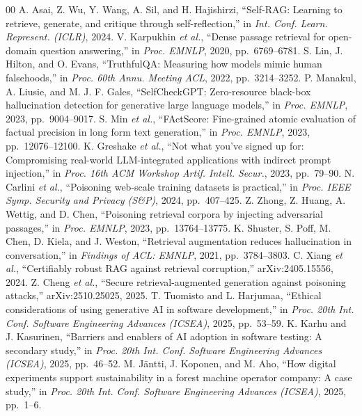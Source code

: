 \begin{thebibliography}{00}
 A. Asai, Z. Wu, Y. Wang, A. Sil, and H. Hajishirzi, ``Self-RAG: Learning to retrieve, generate, and critique through self-reflection,'' in \emph{Int. Conf. Learn. Represent. (ICLR)}, 2024.
 V. Karpukhin \emph{et al.}, ``Dense passage retrieval for open-domain question answering,'' in \emph{Proc. EMNLP}, 2020, pp.~6769--6781.
 S. Lin, J. Hilton, and O. Evans, ``TruthfulQA: Measuring how models mimic human falsehoods,'' in \emph{Proc. 60th Annu. Meeting ACL}, 2022, pp.~3214--3252.
 P. Manakul, A. Liusie, and M. J. F. Gales, ``SelfCheckGPT: Zero-resource black-box hallucination detection for generative large language models,'' in \emph{Proc. EMNLP}, 2023, pp.~9004--9017.
 S. Min \emph{et al.}, ``FActScore: Fine-grained atomic evaluation of factual precision in long form text generation,'' in \emph{Proc. EMNLP}, 2023, pp.~12076--12100.
 K. Greshake \emph{et al.}, ``Not what you've signed up for: Compromising real-world LLM-integrated applications with indirect prompt injection,'' in \emph{Proc. 16th ACM Workshop Artif. Intell. Secur.}, 2023, pp.~79--90.
 N. Carlini \emph{et al.}, ``Poisoning web-scale training datasets is practical,'' in \emph{Proc. IEEE Symp. Security and Privacy (S\&P)}, 2024, pp.~407--425.
 Z. Zhong, Z. Huang, A. Wettig, and D. Chen, ``Poisoning retrieval corpora by injecting adversarial passages,'' in \emph{Proc. EMNLP}, 2023, pp.~13764--13775.
 K. Shuster, S. Poff, M. Chen, D. Kiela, and J. Weston, ``Retrieval augmentation reduces hallucination in conversation,'' in \emph{Findings of ACL: EMNLP}, 2021, pp.~3784--3803.
 C. Xiang \emph{et al.}, ``Certifiably robust RAG against retrieval corruption,'' arXiv:2405.15556, 2024.
 Z. Cheng \emph{et al.}, ``Secure retrieval-augmented generation against poisoning attacks,'' arXiv:2510.25025, 2025.
 T. Tuomisto and L. Harjumaa, ``Ethical considerations of using generative AI in software development,'' in \emph{Proc. 20th Int. Conf. Software Engineering Advances (ICSEA)}, 2025, pp.~53--59.
 K. Karhu and J. Kasurinen, ``Barriers and enablers of AI adoption in software testing: A secondary study,'' in \emph{Proc. 20th Int. Conf. Software Engineering Advances (ICSEA)}, 2025, pp.~46--52.
 M. J\"antti, J. Koponen, and M. Aho, ``How digital experiments support sustainability in a forest machine operator company: A case study,'' in \emph{Proc. 20th Int. Conf. Software Engineering Advances (ICSEA)}, 2025, pp.~1--6.

\end{thebibliography}
